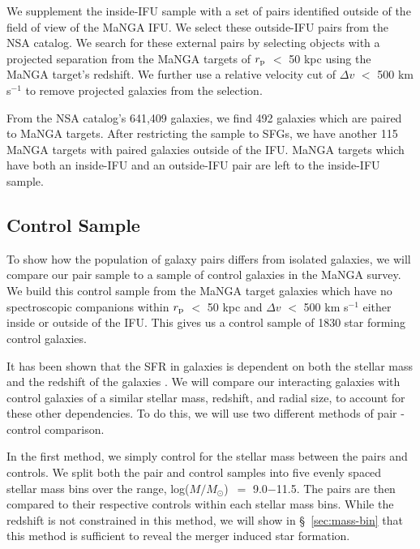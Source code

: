 \documentclass[apj,twocolumn]{emulateapj}
\newcommand{\logm}{log($M/M_{\odot}$)}
\begin{document}
\begin{CJK*}{UTF8}{gbsn}
We supplement the inside-IFU sample with a set of pairs identified outside of the field of view of the MaNGA IFU. We select these outside-IFU pairs from the NSA catalog. We search for these external pairs by selecting objects with a projected separation from the MaNGA targets of $r_{\rm p}$ $<$ 50 kpc using the MaNGA target's redshift. We further use a relative velocity cut of $\Delta v$ $<$ 500 km s$^{-1}$ to remove projected galaxies from the selection. 

From the NSA catalog's 641,409 galaxies, we find 492 galaxies which are paired to MaNGA targets. After restricting the sample to SFGs, we have another 115 MaNGA targets with paired galaxies outside of the IFU. MaNGA targets which have both an inside-IFU and an outside-IFU pair are left to the inside-IFU sample.

\subsection{Control Sample}\label{sec:control}

To show how the population of galaxy pairs differs from isolated galaxies, we will compare our pair sample to a sample of control galaxies in the MaNGA survey. We build this control sample from the MaNGA target galaxies which have no spectroscopic companions within $r_{\rm p}$ $<$ 50 kpc and $\Delta v$ $<$ 500 km s$^{-1}$ either inside or outside of the IFU. This gives us a control sample of 1830 star forming control galaxies. 

It has been shown that the SFR in galaxies is dependent on both the stellar mass and the redshift of the galaxies \citep[e.g.,][]{Noeske:2007}. We will compare our interacting galaxies with control galaxies of a similar stellar mass, redshift, and radial size, to account for these other dependencies. To do this, we will use two different methods of pair - control comparison. 

In the first method, we simply control for the stellar mass between the pairs and controls. We split both the pair and control samples into five evenly spaced stellar mass bins over the range, \logm\ $=$ 9.0$-$11.5. The pairs are then compared to their respective controls within each stellar mass bins. While the redshift is not constrained in this method, we will show in \S~\ref{sec:mass-bin} that this method is sufficient to reveal the merger induced star formation. 


\end{CJK*}
\end{document}
